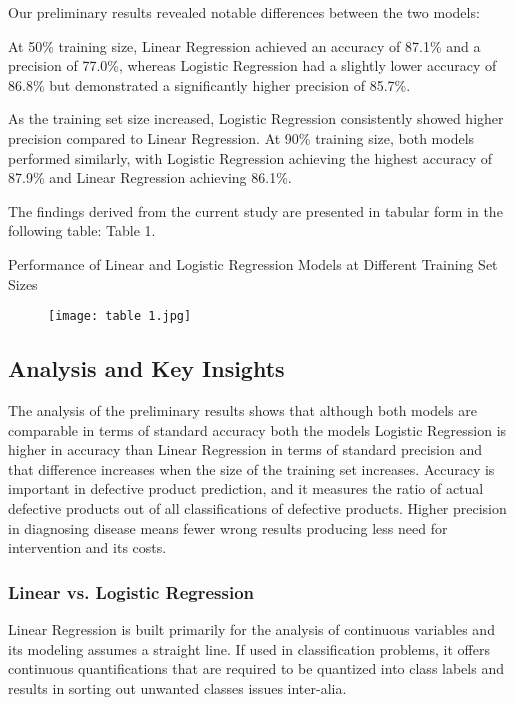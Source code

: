 \documentclass[conference]{IEEEtran}
\begin{document}
Our preliminary results revealed notable differences between the two models:

At 50\% training size, Linear Regression achieved an accuracy of 87.1\% and a precision of 77.0\%, whereas Logistic Regression had a slightly lower accuracy of 86.8\% but demonstrated a significantly higher precision of 85.7\%. 

As the training set size increased, Logistic Regression consistently showed higher precision compared to Linear Regression. At 90\% training size, both models performed similarly, with Logistic Regression achieving the highest accuracy of 87.9\% and Linear Regression achieving 86.1\%.

The findings derived from the current study are presented in tabular form in the following table: Table 1.

\begin{table}[htbp]
\caption{Performance of Linear and Logistic Regression Models at Different Training Set Sizes}
\end{table}
\vspace{-2.5em} 
\begin{figure}[h]
    \centering
    \texttt{[image: table 1.jpg]}
\end{figure}

\subsection{Analysis and Key Insights}
The analysis of the preliminary results shows that although both models are comparable in terms of standard accuracy both the models Logistic Regression is higher in accuracy than Linear Regression in terms of standard precision and that difference increases when the size of the training set increases. Accuracy is important in defective product prediction, and it measures the ratio of actual defective products out of all classifications of defective products. Higher precision in diagnosing disease means fewer wrong results producing less need for intervention and its costs.

\subsubsection{Linear vs. Logistic Regression}

Linear Regression is built primarily for the analysis of continuous variables and its modeling assumes a straight line. If used in classification problems, it offers continuous quantifications that are required to be quantized into class labels and results in sorting out unwanted classes issues inter-alia.
\end{document}
